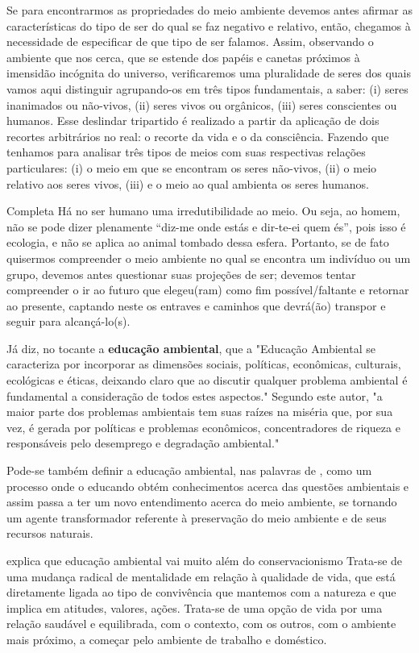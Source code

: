 Se para encontrarmos as propriedades do meio ambiente devemos antes afirmar as características
do tipo de ser do qual se faz negativo e relativo, então, chegamos à necessidade
de especificar de que tipo de ser falamos. Assim, observando o ambiente que nos cerca, que se
estende dos papéis e canetas próximos à imensidão incógnita do universo, verificaremos uma
pluralidade de seres dos quais vamos aqui distinguir agrupando-os em três tipos fundamentais,
a saber: (i) seres inanimados ou não-vivos, (ii) seres vivos ou orgânicos, (iii) seres conscientes
ou humanos. Esse deslindar tripartido é realizado a partir da aplicação de dois recortes arbitrários
no real: o recorte da vida e o da consciência. Fazendo que tenhamos para analisar três tipos
de meios com suas respectivas relações particulares: (i) o meio em que se encontram os seres
não-vivos, (ii) o meio relativo aos seres vivos, (iii) e o meio ao qual ambienta os seres humanos.

Completa  Há no ser humano uma irredutibilidade ao meio. Ou seja, ao homem, não se pode dizer
plenamente “diz-me onde estás e dir-te-ei quem és”, pois isso é ecologia, e não se aplica ao
animal tombado dessa esfera. Portanto, se de fato quisermos compreender o meio ambiente
no qual se encontra um indivíduo ou um grupo, devemos antes questionar suas projeções de
ser; devemos tentar compreender o ir ao futuro que elegeu(ram) como fim possível/faltante e
retornar ao presente, captando neste os entraves e caminhos que devrá(ão) transpor e seguir
para alcançá-lo(s).

Já   diz, no tocante a \textbf{educação ambiental}, que a "Educação Ambiental se caracteriza por
incorporar as dimensões sociais, políticas, econômicas,
culturais, ecológicas e éticas, deixando claro que ao discutir
qualquer problema ambiental é fundamental a consideração
de todos estes aspectos." Segundo este autor, "a maior parte
dos problemas ambientais tem suas raízes na miséria que,
por sua vez, é gerada por políticas e problemas econômicos,
concentradores de riqueza e responsáveis pelo desemprego
e degradação ambiental."

Pode-se também definir a educação ambiental, nas palavras de , como um processo
onde o educando obtém conhecimentos acerca das
questões ambientais e assim passa a ter um novo
entendimento acerca do meio ambiente, se tornando um
agente transformador referente à preservação do meio
ambiente e de seus recursos naturais.

 explica que educação ambiental vai muito além do conservacionismo
Trata-se de uma mudança radical de mentalidade em
relação à qualidade de vida, que está diretamente ligada
ao tipo de convivência que mantemos com a natureza e
que implica em atitudes, valores, ações. Trata-se de uma
opção de vida por uma relação saudável e equilibrada,
com o contexto, com os outros, com o ambiente mais
próximo, a começar pelo ambiente de trabalho e
doméstico.

